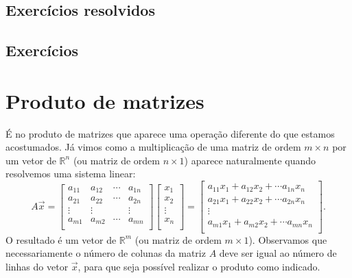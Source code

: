 \documentclass[../livro.tex]{subfiles}  %
\begin{document}
\subsection*{Exercícios resolvidos}

\construirExeresol

\subsection*{Exercícios}

\construirExer


\section{Produto de matrizes}

É no produto de matrizes que aparece uma operação diferente do que estamos acostumados. Já vimos como a multiplicação de uma matriz de ordem $m\times n$ por um vetor de $\mathbb{R}^n$ (ou matriz de ordem $n\times 1$) aparece naturalmente quando resolvemos uma sistema linear:
\begin{equation}
A \vec{x} = \left[
\begin{array}{cccc}
a_{11} & a_{12} & \cdots & a_{1n} \\
a_{21} & a_{22} & \cdots & a_{2n} \\
\vdots & \vdots &        & \vdots \\
a_{m1} & a_{m2} & \cdots & a_{mn} \\
\end{array}
\right]
\left[
\begin{array}{c}
x_{1} \\
x_{2} \\
\vdots \\
x_{n} \\
\end{array}
\right] =
\left[
\begin{array}{c}
a_{11} x_{1} + a_{12} x_{2} + \cdots  a_{1n} x_{n} \\
a_{21} x_{1} + a_{22} x_{2} + \cdots  a_{2n} x_{n} \\
\vdots \\
a_{m1} x_{1} + a_{m2} x_{2} + \cdots  a_{mn} x_{n} \\
\end{array}
\right].
\end{equation} O resultado é um vetor  de $\mathbb{R}^m$ (ou matriz de ordem $m\times 1$). Observamos que necessariamente o número de colunas da matriz $A$ deve ser igual ao número de linhas do vetor $\vec{x}$, para que seja possível realizar o produto como indicado.
\end{document}
